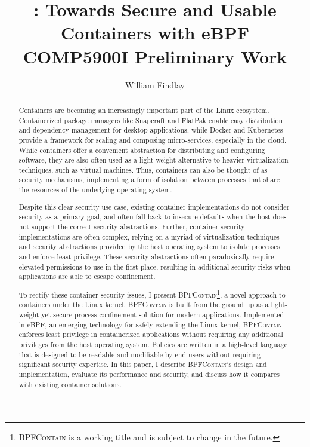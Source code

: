 \documentclass[dvipsnames, 12pt]{article}
\title{\Large \bpfcontain: Towards Secure and Usable Containers with eBPF\\{\large COMP5900I Preliminary Work}}
\author{William Findlay}
\def\bpfcontain{\textsc{BPFContain}}
\begin{document}
\maketitle
\thispagestyle{empty}

\vfill
\begin{abstract}
\noindent
Containers are becoming an increasingly important part of the Linux ecosystem.
Containerized package managers like Snapcraft \cite{snap} and FlatPak
\cite{flatpak} enable easy distribution and dependency management for desktop
applications, while Docker \cite{docker} and Kubernetes \cite{kubernetes}
provide a framework for scaling and composing micro-services, especially in the
cloud.  While containers offer a convenient abstraction for distributing and
configuring software, they are also often used as a light-weight alternative to
heavier virtualization techniques, such as virtual machines. Thus, containers
can also be thought of as security mechanisms, implementing a form of isolation
between processes that share the resources of the underlying operating system.

Despite this clear security use case, existing container implementations do not
consider security as a primary goal, and often fall back to insecure defaults
when the host does not support the correct security abstractions. Further,
container security implementations are often complex, relying on a myriad of
virtualization techniques and security abstractions provided by the host
operating system to isolate processes and enforce least-privilege. These
security abstractions often paradoxically require elevated permissions to use in
the first place, resulting in additional security risks when applications are
able to escape confinement.

To rectify these container security issues, I present
\bpfcontain{}\footnote{\bpfcontain{} is a working title and is subject to change in the
future.}, a novel approach to containers under the Linux kernel. \bpfcontain{} is
built from the ground up as a light-weight yet secure process confinement
solution for modern applications. Implemented in eBPF, an emerging technology
for safely extending the Linux kernel, \bpfcontain{} enforces least privilege in
containerized applications without requiring any additional privileges from the
host operating system. Policies are written in a high-level language that is
designed to be readable and modifiable by end-users without requiring
significant security expertise. In this paper, I describe \bpfcontain{}'s design and
implementation, evaluate its performance and security, and discuss how it
compares with existing container solutions.

\end{abstract}
\vfill
\vfill
\end{document}
